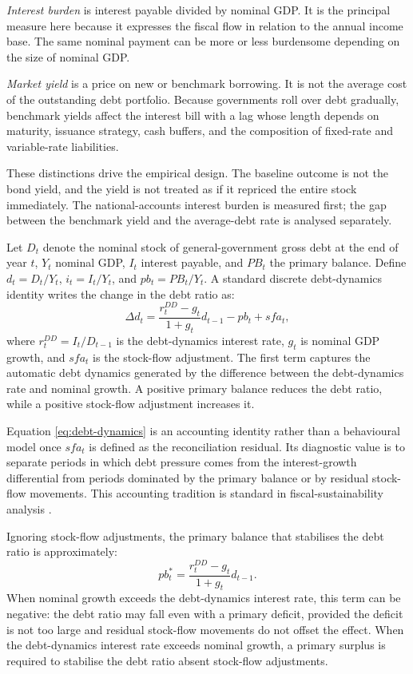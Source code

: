 \documentclass[11pt,a4paper]{article}
\begin{document}
\emph{Interest burden} is interest payable divided by nominal GDP. It is the
principal measure here because it expresses the fiscal flow in relation to the
annual income base. The same nominal payment can be more or less burdensome
depending on the size of nominal GDP.

\emph{Market yield} is a price on new or benchmark borrowing. It is
not the average cost of the outstanding debt portfolio. Because governments
roll over debt gradually, benchmark yields affect the interest bill with a lag
whose length depends on maturity, issuance strategy, cash buffers, and the
composition of fixed-rate and variable-rate liabilities.

These distinctions drive the empirical design. The baseline outcome is not the
bond yield, and the yield is not treated as if it repriced the entire stock
immediately. The national-accounts interest burden is measured first; the gap
between the benchmark yield and the average-debt rate is analysed separately.

Let \(D_t\) denote the nominal stock of general-government gross debt at the
end of year \(t\), \(Y_t\) nominal GDP, \(I_t\) interest payable, and \(PB_t\)
the primary balance. Define \(d_t = D_t/Y_t\), \(i_t = I_t/Y_t\), and
\(pb_t = PB_t/Y_t\). A standard discrete debt-dynamics identity writes the
change in the debt ratio as:
\begin{equation}
  \Delta d_t =
  \frac{r_t^{DD}-g_t}{1+g_t}d_{t-1} - pb_t + sfa_t,
  \label{eq:debt-dynamics}
\end{equation}
where \(r_t^{DD}=I_t/D_{t-1}\) is the debt-dynamics interest rate, \(g_t\) is
nominal GDP growth, and \(sfa_t\) is the stock-flow adjustment. The first term
captures the automatic debt dynamics generated by the difference between the
debt-dynamics rate and nominal growth. A positive primary balance reduces the
debt ratio, while a positive stock-flow adjustment increases it.

Equation \ref{eq:debt-dynamics} is an accounting identity rather than a
behavioural model once \(sfa_t\) is defined as the reconciliation residual. Its
diagnostic value is to separate periods in which debt pressure comes from the
interest-growth differential from periods dominated by the primary balance or
by residual stock-flow movements. This accounting tradition is standard in
fiscal-sustainability analysis \cite{escolano2010,blanchard2019}.

Ignoring stock-flow adjustments, the primary balance that stabilises the debt
ratio is approximately:
\begin{equation}
  pb_t^{*} =
  \frac{r_t^{DD}-g_t}{1+g_t}d_{t-1}.
  \label{eq:stabilising-pb}
\end{equation}
When nominal growth exceeds the debt-dynamics interest rate, this term can be
negative: the debt ratio may fall even with a primary deficit, provided the
deficit is not too large and residual stock-flow movements do not offset the
effect. When the debt-dynamics interest rate exceeds nominal growth, a primary
surplus is required to stabilise the debt ratio absent stock-flow adjustments.
\end{document}
